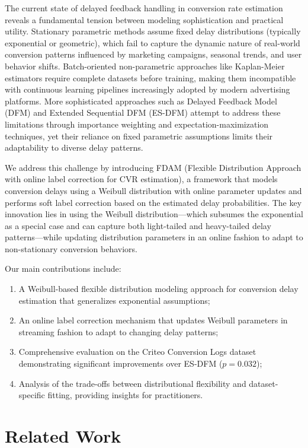 \documentclass{article}
\begin{document}
The current state of delayed feedback handling in conversion rate estimation reveals a fundamental tension between modeling sophistication and practical utility. Stationary parametric methods assume fixed delay distributions (typically exponential or geometric), which fail to capture the dynamic nature of real-world conversion patterns influenced by marketing campaigns, seasonal trends, and user behavior shifts. Batch-oriented non-parametric approaches like Kaplan-Meier estimators require complete datasets before training, making them incompatible with continuous learning pipelines increasingly adopted by modern advertising platforms. More sophisticated approaches such as Delayed Feedback Model (DFM) and Extended Sequential DFM (ES-DFM) attempt to address these limitations through importance weighting and expectation-maximization techniques, yet their reliance on fixed parametric assumptions limits their adaptability to diverse delay patterns.

We address this challenge by introducing FDAM (Flexible Distribution Approach with online label correction for CVR estimation), a framework that models conversion delays using a Weibull distribution with online parameter updates and performs soft label correction based on the estimated delay probabilities. The key innovation lies in using the Weibull distribution---which subsumes the exponential as a special case and can capture both light-tailed and heavy-tailed delay patterns---while updating distribution parameters in an online fashion to adapt to non-stationary conversion behaviors.

Our main contributions include:
\begin{enumerate}
  \item A Weibull-based flexible distribution modeling approach for conversion delay estimation that generalizes exponential assumptions;
  \item An online label correction mechanism that updates Weibull parameters in streaming fashion to adapt to changing delay patterns;
  \item Comprehensive evaluation on the Criteo Conversion Logs dataset demonstrating significant improvements over ES-DFM ($p=0.032$);
  \item Analysis of the trade-offs between distributional flexibility and dataset-specific fitting, providing insights for practitioners.
\end{enumerate}

\section{Related Work}
\end{document}
